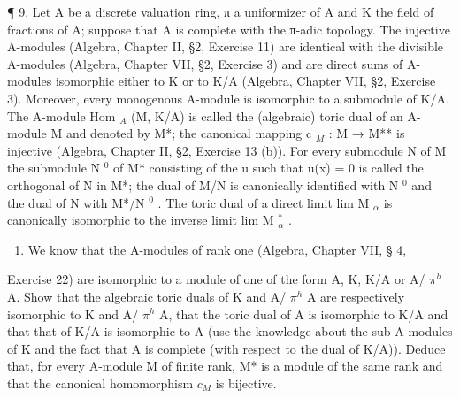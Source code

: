 ¶ 9. Let A be a discrete valuation ring, π a uniformizer of A and K the field of fractions of A; suppose that A is complete with the π-adic topology. The injective A-modules (Algebra, Chapter II, §2, Exercise 11) are identical with the divisible A-modules (Algebra, Chapter VII, §2, Exercise 3) and are direct sums of A-modules isomorphic either to K or to K/A (Algebra, Chapter VII, §2, Exercise 3). Moreover, every monogenous A-module is isomorphic to a submodule of K/A. The A-module Hom \(_{A}\) (M, K/A) is called the (algebraic) toric dual of an A-module M and denoted by M*; the canonical mapping c \(_{M}\) : M → M** is injective (Algebra, Chapter II, §2, Exercise 13 (b)). For every submodule N of M the submodule N \(^{0}\) of M* consisting of the u such that u(x) = 0 is called the orthogonal of N in M*; the dual of M/N is canonically identified with N \(^{0}\) and the dual of N with M*/N \(^{0}\) . The toric dual of a direct limit lim M \(_{\alpha}\) is canonically isomorphic to the inverse limit lim M \(_{\alpha}^{*}\) .

\begin{enumerate}
\def\labelenumi{(\alph{enumi})}
\tightlist
\item
  We know that the A-modules of rank one (Algebra, Chapter VII, § 4,
\end{enumerate}

Exercise 22) are isomorphic to a module of one of the form A, K, K/A or A/ \(\pi^{h}\) A. Show that the algebraic toric duals of K and A/ \(\pi^{h}\) A are respectively isomorphic to K and A/ \(\pi^{h}\) A, that the toric dual of A is isomorphic to K/A and that that of K/A is isomorphic to A (use the knowledge about the sub-A-modules of K and the fact that A is complete (with respect to the dual of K/A)). Deduce that, for every A-module M of finite rank, M* is a module of the same rank and that the canonical homomorphism \(c_{M}\) is bijective.

